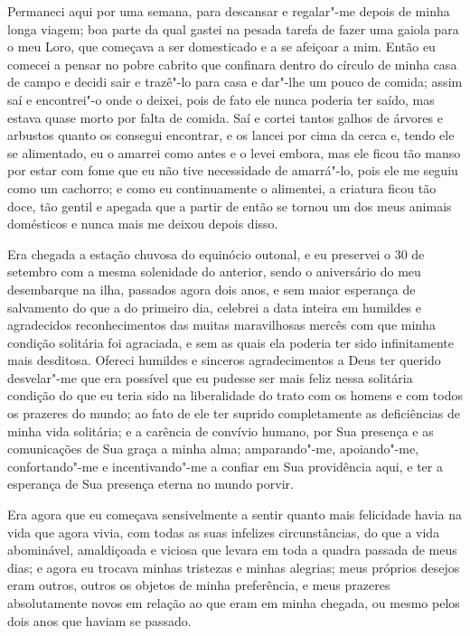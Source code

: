 Permaneci aqui por uma semana, para descansar e regalar"-me depois de
minha longa viagem; boa parte da qual gastei na pesada tarefa de fazer
uma gaiola para o meu Loro, que começava a ser domesticado e a se
afeiçoar a mim. Então eu comecei a pensar no pobre cabrito que confinara
dentro do círculo de minha casa de campo e decidi sair e trazê"-lo para
casa e dar"-lhe um pouco de comida; assim saí e encontrei"-o onde o
deixei, pois de fato ele nunca poderia ter saído, mas estava quase morto
por falta de comida. Saí e cortei tantos galhos de árvores e arbustos
quanto os consegui encontrar, e os lancei por cima da cerca e, tendo ele
se alimentado, eu o amarrei como antes e o levei embora, mas ele ficou
tão manso por estar com fome que eu não tive necessidade de amarrá"-lo,
pois ele me seguiu como um cachorro; e como eu continuamente o
alimentei, a criatura ficou tão doce, tão gentil e apegada que a partir
de então se tornou um dos meus animais domésticos e nunca mais me deixou
depois disso.

Era chegada a estação chuvosa do equinócio outonal, e eu preservei o 30
de setembro com a mesma solenidade do anterior, sendo o aniversário do
meu desembarque na ilha, passados agora dois anos, e sem maior esperança
de salvamento do que a do primeiro dia, celebrei a data inteira em
humildes e agradecidos reconhecimentos das muitas maravilhosas mercês
com que minha condição solitária foi agraciada, e sem as quais ela
poderia ter sido infinitamente mais desditosa. Ofereci humildes e
sinceros agradecimentos a Deus ter querido desvelar"-me que era possível
que eu pudesse ser mais feliz nessa solitária condição do que eu teria
sido na liberalidade do trato com os homens e com todos os prazeres do
mundo; ao fato de ele ter suprido completamente as deficiências de minha
vida solitária; e a carência de convívio humano, por Sua presença e as
comunicações de Sua graça a minha alma; amparando"-me, apoiando"-me,
confortando"-me e incentivando"-me a confiar em Sua providência aqui, e
ter a esperança de Sua presença eterna no mundo porvir.

Era agora que eu começava sensivelmente a sentir quanto mais felicidade
havia na vida que agora vivia, com todas as suas infelizes
circunstâncias, do que a vida abominável, amaldiçoada e viciosa que
levara em toda a quadra passada de meus dias; e agora eu trocava minhas
tristezas e minhas alegrias; meus próprios desejos eram outros, outros
os objetos de minha preferência, e meus prazeres absolutamente novos em
relação ao que eram em minha chegada, ou mesmo pelos dois anos que
haviam se passado.

